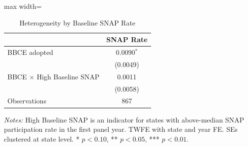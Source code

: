 
\begin{table}[H]
\centering
\caption{Heterogeneity by Baseline SNAP Rate}
\label{tab:hetero}
\begin{adjustbox}{max width=\textwidth}
\begin{threeparttable}
\begin{tabular}{lc}
\toprule
& SNAP Rate \\
\midrule
BBCE adopted & 0.0090$^{*}$ \\
& (0.0049) \\[4pt]
BBCE $\times$ High Baseline SNAP & 0.0011 \\
& (0.0058) \\[4pt]
Observations & 867 \\
\bottomrule
\end{tabular}
\begin{tablenotes}[flushleft]
\small
\item \textit{Notes:} High Baseline SNAP is an indicator for states with above-median SNAP participation rate in the first panel year. TWFE with state and year FE. SEs clustered at state level. * $p<0.10$, ** $p<0.05$, *** $p<0.01$.
\end{tablenotes}
\end{threeparttable}
\end{adjustbox}
\end{table}

